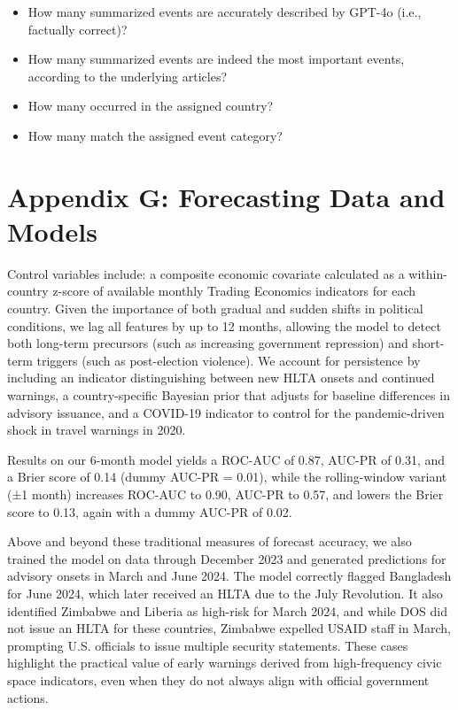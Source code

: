 \documentclass[
  letterpaper,
  DIV=11,
  numbers=noendperiod]{scrartcl}
\providecommand{\tightlist}{%
  \setlength{\itemsep}{0pt}\setlength{\parskip}{0pt}}\usepackage{longtable,booktabs,array}
\begin{document}
\begin{itemize}
\tightlist
\item
  How many summarized events are accurately described by GPT-4o (i.e.,
  factually correct)?
\item
  How many summarized events are indeed the most important events,
  according to the underlying articles?
\item
  How many occurred in the assigned country?
\item
  How many match the assigned event category?
\end{itemize}

\section{Appendix G: Forecasting Data and
Models}\label{appendix-g-forecasting-data-and-models}

Control variables include: a composite economic covariate calculated as
a within-country z-score of available monthly Trading Economics
indicators for each country. Given the importance of both gradual and
sudden shifts in political conditions, we lag all features by up to 12
months, allowing the model to detect both long-term precursors (such as
increasing government repression) and short-term triggers (such as
post-election violence). We account for persistence by including an
indicator distinguishing between new HLTA onsets and continued warnings,
a country-specific Bayesian prior that adjusts for baseline differences
in advisory issuance, and a COVID-19 indicator to control for the
pandemic-driven shock in travel warnings in 2020.

Results on our 6-month model yields a ROC-AUC of 0.87, AUC-PR of 0.31,
and a Brier score of 0.14 (dummy AUC-PR = 0.01), while the
rolling-window variant (±1 month) increases ROC-AUC to 0.90, AUC-PR to
0.57, and lowers the Brier score to 0.13, again with a dummy AUC-PR of
0.02.

Above and beyond these traditional measures of forecast accuracy, we
also trained the model on data through December 2023 and generated
predictions for advisory onsets in March and June 2024. The model
correctly flagged Bangladesh for June 2024, which later received an HLTA
due to the July Revolution. It also identified Zimbabwe and Liberia as
high-risk for March 2024, and while DOS did not issue an HLTA for these
countries, Zimbabwe expelled USAID staff in March, prompting U.S.
officials to issue multiple security statements. These cases highlight
the practical value of early warnings derived from high-frequency civic
space indicators, even when they do not always align with official
government actions.
\end{document}
